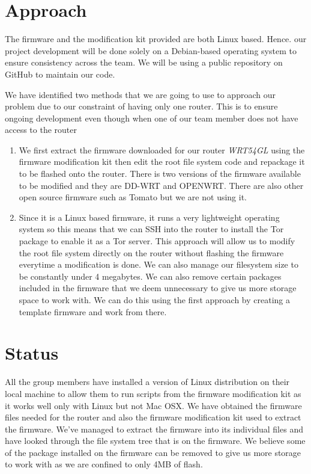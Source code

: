 \documentclass[12pt]{article}
\begin{document}
	\section{Approach}
	
	The firmware and the modification kit provided are both Linux based. Hence. our project development will be done solely on a Debian-based operating system to ensure consistency across the team. We will be using a public repository on GitHub to maintain our code.\newline
	
	We have identified two methods that we are going to use to approach our problem due to our constraint of having only one router. This is to ensure ongoing development even though when one of our team member does not have access to the router
	
	\begin{enumerate}
		\item  We first extract the firmware downloaded for our router \emph{WRT54GL} using the firmware modification kit then edit the root file system code and repackage it to be flashed onto the router. There is two versions of the firmware available to be modified and they are DD-WRT and OPENWRT. There are also other open source firmware such as Tomato but we are not using it. 
		
		\item Since it is a Linux based firmware, it runs a very lightweight operating system so this means that we can SSH into the router to install the Tor package to enable it as a Tor server. This approach will allow us to modify the root file system directly on the router without flashing the firmware everytime a modification is done. We can also manage our filesystem size to be constantly under 4 megabytes. We can also remove certain packages included in the firmware that we deem unnecessary to give us more storage space to work with. We can do this using the first approach by creating a template firmware and work from there. 
		
	\end{enumerate}
	
	\newpage
	\section{Status}
	
	All the group members have installed a version of Linux distribution on their local machine to allow them to run scripts from the firmware modification kit as it works well only with Linux but not Mac OSX. We have obtained the firmware files needed for the router and also the firmware modification kit used to extract the firmware. We've managed to extract the firmware into its individual files and have looked through the file system tree that is on the firmware. We believe some of the package installed on the firmware can be removed to give us more storage to work with as we are confined to only 4MB of flash.\newline 
	
\end{document}
